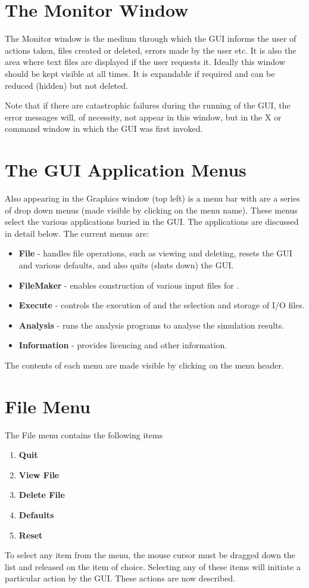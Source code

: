 \section{The Monitor Window}

The Monitor window is the medium through which the GUI informs the
user of actions taken, files created or deleted, errors made by
the user etc. It is also the area where text files are displayed if
the user requests it. Ideally this window should be kept visible at
all times. It is expandable if required and can be reduced (hidden)
but not deleted.

Note that if there are catastrophic failures during the running of the
GUI, the error messages will, of necessity, not appear in this window,
but in the X or command window in which the GUI was first invoked.

\section{The GUI Application Menus}

Also appearing in the Graphics window (top left) is a menu bar with
are a series of drop down menus (made visible by clicking on the menu
name). These menus select the various applications buried in the
GUI. The applications are discussed in detail below. The current menus
are:
\begin{itemize}
\item {\bf File} - handles file operations, such as viewing and
deleting, resets the GUI and various defaults, and also quits (shuts
down) the GUI.
\item {\bf FileMaker} - enables construction of various input
files for \DD{}. 
\item {\bf Execute} - controls the execution of \DD{} and the selection and
storage of I/O files.
\item {\bf Analysis} - runs the \DD{} analysis programs to analyse the
simulation results.
\item{\bf Information} - provides licencing and other information.
\end{itemize}

The contents of each menu are made visible by clicking on the menu
header.

\section{File Menu}

The File menu contains the following items
\begin{enumerate}
\item {\bf Quit}
\item {\bf View File}
\item {\bf Delete File}
\item {\bf Defaults}
\item {\bf Reset}
\end{enumerate}
To select any item from the menu, the mouse cursor must be dragged
down the list and released on the item of choice.  Selecting any of
these items will initiate a particular action by the GUI. These
actions are now described.

